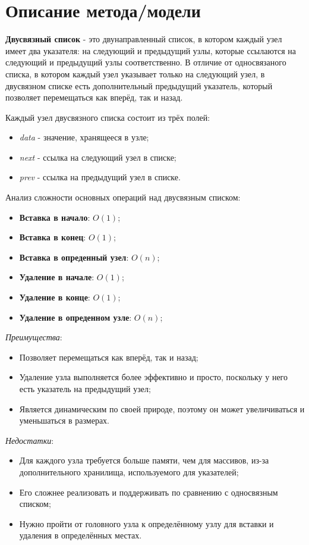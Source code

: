 \documentclass[12pt, a4paper]{report}
\begin{document}
	\section*{Описание метода/модели}
	\large
	\textbf{Двусвязный список} - это двунаправленный список, в котором каждый узел имеет два указателя: на следующий и предыдущий узлы, которые ссылаются на следующий и предыдущий узлы соответственно. В отличие от односвязаного списка, в котором каждый узел указывает только на следующий узел, в двусвязном списке есть дополнительный предыдущий указатель, который позволяет перемещаться как вперёд, так и назад. \par
	Каждый узел двусвязного списка состоит из трёх полей:
	\begin{itemize}
		\item \textit{data} - значение, хранящееся в узле;
		\item \textit{next} - ссылка на следующий узел в списке;
		\item \textit{prev} - ссылка на предыдущий узел в списке.
	\end{itemize}
	\par
	Анализ сложности основных операций над двусвязным списком:
	\begin{itemize}
		\item \textbf{Вставка в начало}: \( O(1) \); 
		\item \textbf{Вставка в конец}: \( O(1) \); 
		\item \textbf{Вставка в опреденный узел}: \( O(n) \); 
		\item \textbf{Удаление в начале}: \( O(1) \); 
		\item \textbf{Удаление в конце}: \( O(1) \); 
		\item \textbf{Удаление в опреденном узле}: \( O(n) \); 
	\end{itemize}
	\par
	\textit{Преимущества}:
	\begin{itemize}
		\item Позволяет перемещаться как вперёд, так и назад;
		\item Удаление узла выполняется более эффективно и просто, поскольку у него есть указатель на предыдущий узел;
		\item Является динамическим по своей природе, поэтому он может увеличиваться и уменьшаться в размерах.
	\end{itemize}
	\par
	\textit{Недостатки}:
	\begin{itemize}
		\item Для каждого узла требуется больше памяти, чем для массивов, из-за дополнительного хранилища, используемого для указателей;
		\item Его сложнее реализовать и поддерживать по сравнению с односвязным списком;
		\item Нужно пройти от головного узла к определённому узлу для вставки и удаления в определённых местах.
	\end{itemize}
\end{document}
